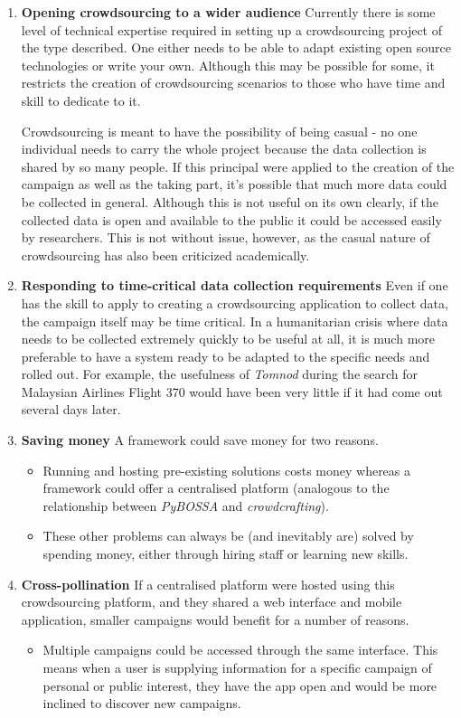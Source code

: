 \documentclass{article}
\newcommand{\pitem}[1]{
	\item{\textbf{#1}}
}
\begin{document}
		\begin{enumerate}
			\pitem{Opening crowdsourcing to a wider audience} Currently there is some level of technical expertise required in setting up a crowdsourcing project of the type described. One either needs to be able to adapt existing open source technologies or write your own. Although this may be possible for some, it restricts the creation of crowdsourcing scenarios to those who have time and skill to dedicate to it.

			Crowdsourcing is meant to have the possibility of being casual - no one individual needs to carry the whole project because the data collection is shared by so many people. If this principal were applied to the creation of the campaign as well as the taking part, it's possible that much more data could be collected in general. Although this is not useful on its own clearly, if the collected data is open and available to the public it could be accessed easily by researchers. This is not without issue, however, as the casual nature of crowdsourcing has also been criticized academically\cite{brabham_myth_2012}.
			\pitem{Responding to time-critical data collection requirements} Even if one has the skill to apply to creating a crowdsourcing application to collect data, the campaign itself may be time critical. In a humanitarian crisis where data needs to be collected extremely quickly to be useful at all, it is much more preferable to have a system ready to be adapted to the specific needs and rolled out. For example, the usefulness of \emph{Tomnod} during the search for Malaysian Airlines Flight 370 would have been very little if it had come out several days later.
			\pitem{Saving money} A framework could save money for two reasons.
			\begin{itemize}
				\item Running and hosting pre-existing solutions costs money whereas a framework could offer a centralised platform (analogous to the relationship between \emph{PyBOSSA} and \emph{crowdcrafting}).
				\item These other problems can always be (and inevitably are) solved by spending money, either through hiring staff or learning new skills.
			\end{itemize}
			\pitem{Cross-pollination} If a centralised platform were hosted using this crowdsourcing platform, and they shared a web interface and mobile application, smaller campaigns would benefit for a number of reasons.
			\begin{itemize}
				\item Multiple campaigns could be accessed through the same interface. This means when a user is supplying information for a specific campaign of personal or public interest, they have the app open and would be more inclined to discover new campaigns.

\end{itemize}
\end{enumerate}
\end{document}
